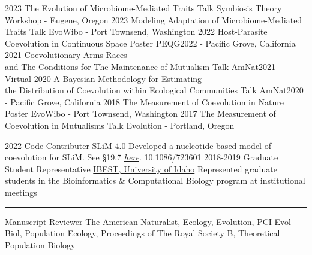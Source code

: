 \documentclass[9pt]{developercv} %
\begin{document}
\vspace{-10 pt}
\begin{preslist}
    \pres
    {2023}
    {The Evolution of Microbiome-Mediated Traits}
    {Talk}
    {Symbiosis Theory Workshop - Eugene, Oregon}
    \pres
    {2023}
    {Modeling Adaptation of Microbiome-Mediated Traits}
    {Talk}
    {EvoWibo - Port Townsend, Washington}
    \pres
    {2022}
    {Host-Parasite Coevolution in Continuous Space}
    {Poster}
    {PEQG2022 - Pacific Grove, California}
    \pres
    {2021}
    {Coevolutionary Arms Races\\ and The Conditions for The Maintenance of Mutualism}
    {Talk}
    {AmNat2021 - Virtual}
    \pres
    {2020}
    {A Bayesian Methodology for Estimating\\ the Distribution of Coevolution within Ecological Communities}
    {Talk}
    {AmNat2020 - Pacific Grove, California}
    \pres
    {2018}
    {The Measurement of Coevolution in Nature}
    {Poster}
    {EvoWibo - Port Townsend, Washington}
    \pres
    {2017}
    {The Measurement of Coevolution in Mutualisms}
    {Talk}
    {Evolution - Portland, Oregon}
\end{preslist}

\vspace{-10 pt}
\begin{publist}
    \pub
    {2022}
    {Code Contributer}
    {SLiM 4.0}
    {Developed a nucleotide-based model of coevolution for SLiM. See §19.7 \href{https://github.com/MesserLab/SLiM/releases/download/v4.0.1/SLiM_Manual.pdf}{\emph{here}}.}
    {10.1086/723601}
    \entry
    {2018-2019}
    {Graduate Student Representative}
    {\href{https://www.iids.uidaho.edu/about.php}{IBEST, University of Idaho}}
    {Represented graduate students in the Bioinformatics \& Computational Biology program at institutional meetings}
    \entry
    {\rule{0.6cm}{0.1pt}}
    {Manuscript Reviewer}
    {}
    {The American Naturalist, Ecology, Evolution, PCI Evol Biol, Population Ecology, Proceedings of The Royal Society B, Theoretical Population Biology}
\end{publist}
\end{document}
